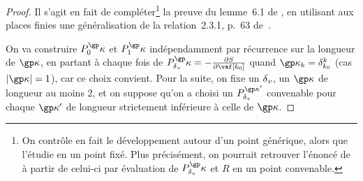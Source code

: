 \begin{proof}
  Il s'agit en fait de compléter\footnote{On contrôle en fait le développement
    autour d'un point générique, alors que  l'étudie en un point
    fixé. Plus précisément, on pourrait retrouver l'énoncé de  à
    partir de celui-ci par évaluation de \( P_\dv^\derp \) et \( R
    \) en un point convenable.} la preuve du lemme~6.1 de \cite{remivds}, en
  utilisant aux places finies une généralisation de la relation~2.3.1, p.~63
  de~\cite{farhith}.

  On va construire \( P_0^\derp \) et \( P_1^\derp \) indépendamment par
  récurrence sur la longueur de \( \derp \), en partant à chaque fois de \(
    P_\dv^\derp = - \frac{\partial S}{\partial \vaf[\ind_0]} \) quand \(
    \derp_{\ind} = \delta^\ind_{\ind_0} \) (cas \( \lgr\derp = 1 \)), car ce
  choix convient.  Pour la suite, on fixe un \( {\delta\smash{\sb v}} \), un \( \derp \) de
  longueur au moins \( 2 \), et on suppose qu'on a choisi un \( P_\dv^{\derp'}
  \) convenable pour chaque \( \derp' \) de longueur strictement inférieure à
  celle de \( \derp \).


\end{proof}
